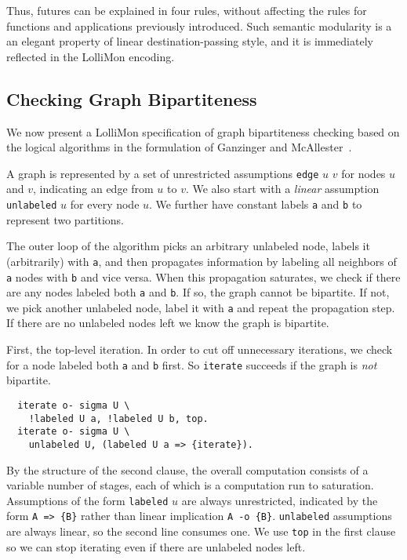 \documentclass{sig-alt}
\begin{document}
Thus, futures can be explained in four rules, without affecting the rules
for functions and applications previously introduced.  Such semantic
modularity is a an elegant property of linear destination-passing style,
and it is immediately reflected in the LolliMon encoding.

\subsection{Checking Graph Bipartiteness}
\label{ssec:gbc}
We now present a LolliMon specification of graph bipartiteness
checking based on the logical algorithms in the formulation
of Ganzinger and McAllester~\cite{Ganzinger02iclp}.  

A graph is represented by a set of unrestricted assumptions
\texttt{edge} $u$ $v$ for nodes $u$ and $v$, indicating an edge
from $u$ to $v$.  We also start with a \emph{linear} assumption
\texttt{unlabeled} $u$ for every node $u$.  We further have constant
labels \texttt{a} and \texttt{b} to represent two partitions.

The outer loop of the algorithm picks an arbitrary unlabeled node,
labels it (arbitrarily) with \texttt{a}, and then propagates
information by labeling all neighbors of \texttt{a} nodes with
\texttt{b} and vice versa.  When this propagation saturates, we check if
there are any nodes labeled both \texttt{a} and \texttt{b}.  If so, the
graph cannot be bipartite.  If not, we pick another unlabeled node, label
it with \texttt{a} and repeat the propagation step.  If there are no
unlabeled nodes left we know the graph is bipartite.

First, the top-level iteration.  In order to cut off unnecessary
iterations, we check for a node labeled both \texttt{a} and \texttt{b}
first.  So
\texttt{iterate} succeeds if the graph is \emph{not} bipartite.

\begin{small}\begin{verbatim}
  iterate o- sigma U \
    !labeled U a, !labeled U b, top.
  iterate o- sigma U \
    unlabeled U, (labeled U a => {iterate}).
\end{verbatim}\end{small}

\noindent By the structure of the second clause,
the overall computation consists of a variable number of
stages, each of which is a computation run to saturation.
Assumptions of the form \texttt{labeled} $u$ are always
unrestricted,
indicated by the form \texttt{A => \{B\}} rather than linear
implication \texttt{A -o \{B\}}.  \texttt{unlabeled} assumptions are
always linear, so the second line consumes one.  We use
\texttt{top} in the first clause so we can stop iterating
even if there are unlabeled nodes left.
\end{document}
